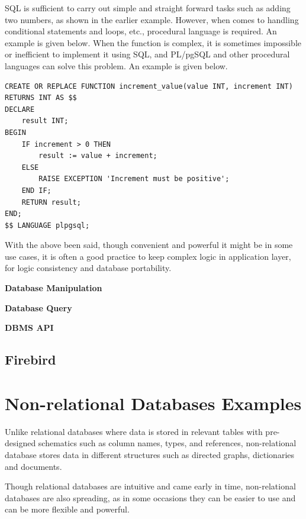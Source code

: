 SQL is sufficient to carry out simple and straight forward tasks such as adding two numbers, as shown in the earlier example. However, when comes to handling conditional statements and loops, etc., procedural language is required. An example is given below. When the function is complex, it is sometimes impossible or inefficient to implement it using SQL, and PL/pgSQL and other procedural languages can solve this problem. An example is given below.
\begin{lstlisting}
CREATE OR REPLACE FUNCTION increment_value(value INT, increment INT)
RETURNS INT AS $$
DECLARE
	result INT;
BEGIN
	IF increment > 0 THEN
		result := value + increment;
	ELSE
		RAISE EXCEPTION 'Increment must be positive';
	END IF;
	RETURN result;
END;
$$ LANGUAGE plpgsql;
\end{lstlisting}

With the above been said, though convenient and powerful it might be in some use cases, it is often a good practice to keep complex logic in application layer, for logic consistency and database portability.

\vspace{0.1in}
\noindent \textbf{Database Manipulation}
\vspace{0.1in}

\vspace{0.1in}
\noindent \textbf{Database Query}
\vspace{0.1in}

\vspace{0.1in}
\noindent \textbf{DBMS API}
\vspace{0.1in}

\subsection{Firebird}

\section{Non-relational Databases Examples}

Unlike relational databases where data is stored in relevant tables with pre-designed schematics such as column names, types, and references, non-relational database stores data in different structures such as directed graphs, dictionaries and documents.

Though relational databases are intuitive and came early in time, non-relational databases are also spreading, as in some occasions they can be easier to use and can be more flexible and powerful.

